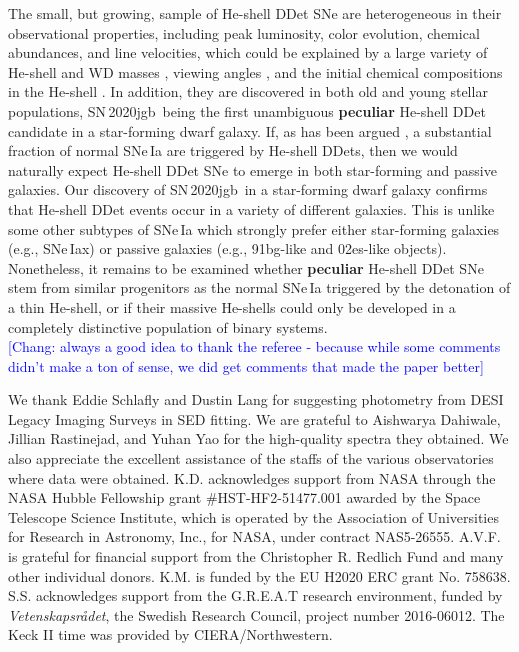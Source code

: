 \documentclass[twocolumn]{aastex631}
\newcommand{\sn}{SN\,2020jgb}
\newcommand{\chang}[1]{\textcolor{blue}{[Chang: #1]}}
\newcommand{\revise}[1]{\textbf{#1}}
\begin{document}
The small, but growing, sample of He-shell DDet SNe are heterogeneous in their observational properties, including peak luminosity, color evolution, chemical abundances, and line velocities, which could be explained by a large variety of He-shell and WD masses \citep{polin_observational_2019,Shen_2D_2021}, viewing angles \citep{Shen_2D_2021}, and the initial chemical compositions in the He-shell \citep{Kromer_DD_2010}. In addition, they are discovered in both old and young stellar populations, \sn\ being the first unambiguous \revise{peculiar} He-shell DDet candidate in a star-forming dwarf galaxy. If, as has been argued \citep[e.g.,][]{Sanders_2021, Eitner_2022}, a substantial fraction of normal SNe\,Ia are triggered by He-shell DDets, then we would naturally expect He-shell DDet SNe to emerge in both star-forming and passive galaxies. Our discovery of \sn\ in a star-forming dwarf galaxy confirms that He-shell DDet events occur in a variety of different galaxies. This is unlike some other subtypes of SNe\,Ia \citep{Jha_2019} which strongly prefer either star-forming galaxies (e.g., SNe\,Iax) or passive galaxies (e.g., 91bg-like and 02es-like objects). Nonetheless, it remains to be examined whether \revise{peculiar} He-shell DDet SNe stem from similar progenitors as the normal SNe\,Ia triggered by the detonation of a thin He-shell, or if their massive He-shells could only be developed in a completely distinctive population of binary systems.\\

\chang{always a good idea to thank the referee - because while some comments didn't make a ton of sense, we did get comments that made the paper better}

\noindent We thank Eddie Schlafly and Dustin Lang for suggesting photometry from DESI Legacy Imaging Surveys in SED fitting. We are grateful to Aishwarya Dahiwale, Jillian Rastinejad, and Yuhan Yao for the high-quality spectra they obtained. We also appreciate the excellent assistance of the staffs of the various observatories where data were obtained. K.D. acknowledges support from NASA through the NASA Hubble Fellowship grant \#HST-HF2-51477.001 awarded by the Space Telescope Science Institute, which is operated by the Association of Universities for Research in Astronomy, Inc., for NASA, under contract NAS5-26555. A.V.F. is grateful for financial support from the Christopher R. Redlich Fund and many other individual donors. K.M. is funded by the EU H2020 ERC grant No. 758638. S.S. acknowledges support from the G.R.E.A.T research environment, funded by {\em Vetenskapsr\aa det}, the Swedish Research Council, project number 2016-06012. The Keck II time was provided by CIERA/Northwestern.
\end{document}
